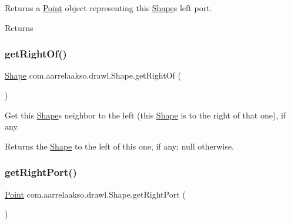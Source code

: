 Returns a \hyperlink{classcom_1_1aarrelaakso_1_1drawl_1_1_point}{Point} object representing this \hyperlink{classcom_1_1aarrelaakso_1_1drawl_1_1_shape}{Shape}\textquotesingle{}s left port. 

\begin{DoxyReturn}{Returns}

\end{DoxyReturn}
\mbox{\label{classcom_1_1aarrelaakso_1_1drawl_1_1_shape_a1ad573b06f341aa79f6a255a476ae6e4}} 
\subsubsection{\texorpdfstring{get\+Right\+Of()}{getRightOf()}}
{\footnotesize\ttfamily \hyperlink{classcom_1_1aarrelaakso_1_1drawl_1_1_shape}{Shape} com.\+aarrelaakso.\+drawl.\+Shape.\+get\+Right\+Of (\begin{DoxyParamCaption}{ }\end{DoxyParamCaption})\hspace{0.3cm}{\ttfamily [inherited]}}



Get this \hyperlink{classcom_1_1aarrelaakso_1_1drawl_1_1_shape}{Shape}\textquotesingle{}s neighbor to the left (this \hyperlink{classcom_1_1aarrelaakso_1_1drawl_1_1_shape}{Shape} is to the right of that one), if any. 

\begin{DoxyReturn}{Returns}
the \hyperlink{classcom_1_1aarrelaakso_1_1drawl_1_1_shape}{Shape} to the left of this one, if any; {\ttfamily null} otherwise. 
\end{DoxyReturn}
\mbox{\label{classcom_1_1aarrelaakso_1_1drawl_1_1_shape_a319c78d425ec91e1aef1072a95e349ad}} 
\subsubsection{\texorpdfstring{get\+Right\+Port()}{getRightPort()}}
{\footnotesize\ttfamily \hyperlink{classcom_1_1aarrelaakso_1_1drawl_1_1_point}{Point} com.\+aarrelaakso.\+drawl.\+Shape.\+get\+Right\+Port (\begin{DoxyParamCaption}{ }\end{DoxyParamCaption})\hspace{0.3cm}{\ttfamily [inherited]}}



